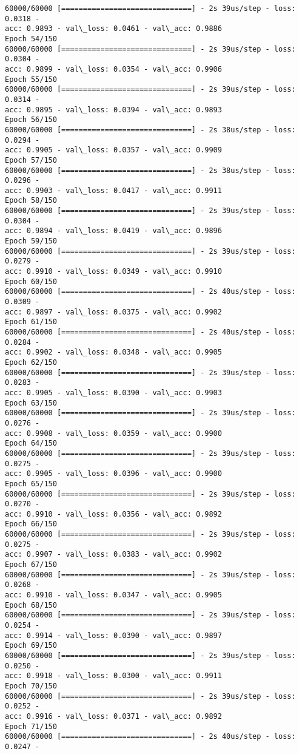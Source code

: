 \documentclass[11pt]{article}
\begin{document}
\begin{Verbatim}[commandchars=\\\{\}]
60000/60000 [==============================] - 2s 39us/step - loss: 0.0318 -
acc: 0.9893 - val\_loss: 0.0461 - val\_acc: 0.9886
Epoch 54/150
60000/60000 [==============================] - 2s 39us/step - loss: 0.0304 -
acc: 0.9899 - val\_loss: 0.0354 - val\_acc: 0.9906
Epoch 55/150
60000/60000 [==============================] - 2s 39us/step - loss: 0.0314 -
acc: 0.9895 - val\_loss: 0.0394 - val\_acc: 0.9893
Epoch 56/150
60000/60000 [==============================] - 2s 38us/step - loss: 0.0294 -
acc: 0.9905 - val\_loss: 0.0357 - val\_acc: 0.9909
Epoch 57/150
60000/60000 [==============================] - 2s 38us/step - loss: 0.0296 -
acc: 0.9903 - val\_loss: 0.0417 - val\_acc: 0.9911
Epoch 58/150
60000/60000 [==============================] - 2s 39us/step - loss: 0.0304 -
acc: 0.9894 - val\_loss: 0.0419 - val\_acc: 0.9896
Epoch 59/150
60000/60000 [==============================] - 2s 39us/step - loss: 0.0279 -
acc: 0.9910 - val\_loss: 0.0349 - val\_acc: 0.9910
Epoch 60/150
60000/60000 [==============================] - 2s 40us/step - loss: 0.0309 -
acc: 0.9897 - val\_loss: 0.0375 - val\_acc: 0.9902
Epoch 61/150
60000/60000 [==============================] - 2s 40us/step - loss: 0.0284 -
acc: 0.9902 - val\_loss: 0.0348 - val\_acc: 0.9905
Epoch 62/150
60000/60000 [==============================] - 2s 39us/step - loss: 0.0283 -
acc: 0.9905 - val\_loss: 0.0390 - val\_acc: 0.9903
Epoch 63/150
60000/60000 [==============================] - 2s 39us/step - loss: 0.0276 -
acc: 0.9908 - val\_loss: 0.0359 - val\_acc: 0.9900
Epoch 64/150
60000/60000 [==============================] - 2s 39us/step - loss: 0.0275 -
acc: 0.9905 - val\_loss: 0.0396 - val\_acc: 0.9900
Epoch 65/150
60000/60000 [==============================] - 2s 39us/step - loss: 0.0270 -
acc: 0.9910 - val\_loss: 0.0356 - val\_acc: 0.9892
Epoch 66/150
60000/60000 [==============================] - 2s 39us/step - loss: 0.0275 -
acc: 0.9907 - val\_loss: 0.0383 - val\_acc: 0.9902
Epoch 67/150
60000/60000 [==============================] - 2s 39us/step - loss: 0.0268 -
acc: 0.9910 - val\_loss: 0.0347 - val\_acc: 0.9905
Epoch 68/150
60000/60000 [==============================] - 2s 39us/step - loss: 0.0254 -
acc: 0.9914 - val\_loss: 0.0390 - val\_acc: 0.9897
Epoch 69/150
60000/60000 [==============================] - 2s 39us/step - loss: 0.0250 -
acc: 0.9918 - val\_loss: 0.0300 - val\_acc: 0.9911
Epoch 70/150
60000/60000 [==============================] - 2s 39us/step - loss: 0.0252 -
acc: 0.9916 - val\_loss: 0.0371 - val\_acc: 0.9892
Epoch 71/150
60000/60000 [==============================] - 2s 40us/step - loss: 0.0247 -

\end{Verbatim}
\end{document}
